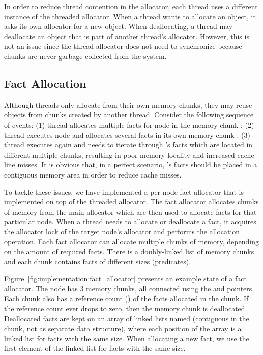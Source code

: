 In order to reduce thread contention in the allocator, each thread uses a
different instance of the threaded allocator. When a thread wants to allocate an
object, it asks its own allocator for a new object. When deallocating, a thread
may deallocate an object that is part of another thread's allocator. However,
this is not an issue since the thread allocator does not need to synchronize
because chunks are never garbage collected from the system.

\subsection{Fact Allocation}

Although threads only allocate from their own memory chunks, they may reuse
objects from chunks created by another thread. Consider the following sequence
of events: (1) thread  allocates multiple facts for node  in
the memory chunk ; (2) thread  executes node  and
allocates several facts in its own memory chunk ; (3) thread 
executes  again and needs to iterate through 's facts which are
located in different multiple chunks, resulting in poor memory locality and
increased cache line misses. It is obvious that, in a perfect scenario,
's facts should be placed in a contiguous memory area in order to reduce
cache misses.

To tackle these issues, we have implemented a per-node fact allocator that is
implemented on top of the threaded allocator. The fact allocator allocates
chunks of memory from the main allocator which are then used to allocate facts
for that particular node. When a thread needs to allocate or deallocate a fact,
it acquires the allocator lock of the target node's allocator and performs the
allocation operation. Each fact allocator can allocate multiple chunks of
memory, depending on the amount of required facts. There is a doubly-linked list
of memory chunks and each chunk contains facts of different sizes (predicates).

Figure~\ref{fig:implementation:fact_allocator} presents an example state of a
fact allocator. The node has 3 memory chunks, all connected using the
 and  pointers. Each chunk also has a reference count
() of the facts allocated in the chunk. If the reference count
ever drops to zero, then the memory chunk is deallocated. Deallocated facts are
kept on an array of linked lists named  (contiguous in the
chunk, not as separate data structure), where each position of the array is a
linked list for facts with the same size. When allocating a new fact, we use the
first element of the linked list for facts with the same size.

